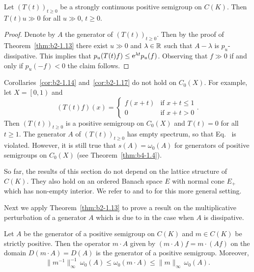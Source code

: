 \begin{corollary}\label{cor:b2-1.17}
Let $(T(t))_{t \geq 0}$ be a strongly continuous positive semigroup on $C(K)$.
Then $T(t)u \gg 0$ for all $u \gg 0$, $t \geq 0$.
\end{corollary}
\begin{proof}
Denote by $A$ the generator of\/ $(T(t))_{t \geq 0}$.
Then by the proof of Theorem~\ref{thm:b2-1.13} there exist $u \gg 0$ and $\lambda \in \mathbb{R}$ such that $A - \lambda$ is $p_{u}$-dissipative.
This implies that $p_{u}(T(t)f) \leq \eu^{\lambda t}p_{u}(f)$.
Observing that $f \gg 0$ if and only if\/ $p_{u}(-f) < 0$ the claim follows.
\end{proof}
\begin{remark}\label{rem:b2-1.18}
Corollaries~\ref{cor:b2-1.14} and~\ref{cor:b2-1.17} do not hold on $C_{0}(X)$.
For example, let $X = \left[0,1\right)$ and
\[
    (T(t)f)(x) = \begin{cases}
        f(x+t) & \text{if } x+t \leq 1 \\
        0 & \text{if } x+t > 0
    \end{cases}.
\]
Then $(T(t))_{t \geq 0}$ is a positive semigroup on $C_{0}(X)$ and $T(t) = 0$ for all $t \geq 1$.
The generator $A$ of\/ $(T(t))_{t \geq 0}$ has empty spectrum, so that Eq.~ is violated.
However, it is still true that $s(A) = \omega_{0}(A)$ for generators of positive semigroups on $C_{0}(X)$ (see Theorem~\ref{thm:b4-1.4}).
\end{remark}
\begin{remark}\label{rem:b2-1.19}
So far, the results of this section do not depend on the lattice structure of\/ $C(K)$.
They also hold on an ordered Banach space $E$ with normal cone $E_{+}$ which has non-empty interior.
We refer to \textcite{arendtchernoffkato:1982} and to \textcite{battyrobinson:1984} for this more general setting.
\end{remark}
Next we apply Theorem~\ref{thm:b2-1.13} to prove a result on the multiplicative perturbation of a generator $A$ which is due to \textcite{dorroh:1966} in the case when $A$ is dissipative.
\begin{theorem}\label{thm:b2-1.20}
Let $A$ be the generator of a positive semigroup on $C(K)$ and  $m \in C(K)$ be strictly positive.
Then the operator $m \cdot A$ given by $(m \cdot A)f = m \cdot (Af)$ on the domain $D(m \cdot A) = D(A)$ is the generator of a positive semigroup.
Moreover,
\begin{equation}\label{eq:b2-1.10}
\|m^{-1}\|_{\infty}^{-1}\, \omega_{0}(A) \leq \omega_{0}(m \cdot A) \leq \|m\|_{\infty}\, \omega_{0}(A).
\end{equation}
\end{theorem}
